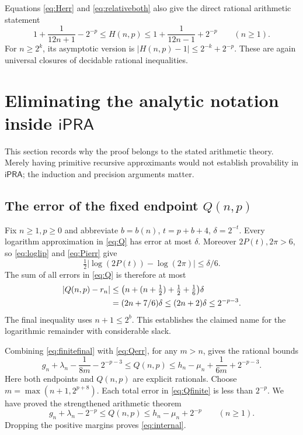 \documentclass[11pt]{article}
\theoremstyle{definition}
\newcommand{\ipra}{\mathsf{iPRA}}
\newcommand{\abs}[1]{\left|#1\right|}
\newcommand{\lmargin}{\lambda}
\newcommand{\umargin}{\mu}
\begin{document}
Equations \eqref{eq:Herr} and \eqref{eq:relativeboth} also give the
direct rational arithmetic statement
\begin{equation}\label{eq:Hinternal}
 1+\frac1{12n+1}-2^{-p}\le H(n,p)
 \le1+\frac1{12n-1}+2^{-p}\qquad(n\ge1).
\end{equation}
For $n\ge2^k$, its asymptotic version is
$\abs{H(n,p)-1}\le2^{-k}+2^{-p}$. These are again universal closures
of decidable rational inequalities.

\section{Eliminating the analytic notation inside \texorpdfstring{$\ipra$}{iPRA}}
\label{sec:elimination}

This section records why the proof belongs to the stated arithmetic
theory. Merely having primitive recursive approximants would not establish
provability in $\ipra$; the induction and precision arguments matter.

\subsection{The error of the fixed endpoint \texorpdfstring{$Q(n,p)$}{Q(n,p)}}

Fix $n\ge1,p\ge0$ and abbreviate $b=b(n)$, $t=p+b+4$,
$\delta=2^{-t}$. Every logarithm approximation in \eqref{eq:Q} has
error at most $\delta$. Moreover $2P(t),2\pi>6$, so
\eqref{eq:loglip} and \eqref{eq:Pierr} give
\[
 \tfrac12\abs{\log(2P(t))-\log(2\pi)}\le\delta/6.
\]
The sum of all errors in \eqref{eq:Q} is therefore at most
\begin{align}
 \abs{Q(n,p)-r_n}
 &\le\bigl(n+(n+\tfrac12)+\tfrac12+\tfrac16\bigr)\delta\notag\\
 &= (2n+7/6)\delta
 \le(2n+2)\delta\le2^{-p-3}.\label{eq:Qerr}
\end{align}
The final inequality uses $n+1\le2^b$. This establishes the claimed
name for the logarithmic remainder with considerable slack.

Combining \eqref{eq:finitefinal} with \eqref{eq:Qerr}, for any
$m>n$, gives the rational bounds
\begin{equation}\label{eq:Qfinite}
 g_n+\lmargin_n-\frac1{8m}-2^{-p-3}
 \le Q(n,p)
 \le h_n-\umargin_n+\frac1{6m}+2^{-p-3}.
\end{equation}
Here both endpoints and $Q(n,p)$ are explicit rationals. Choose
$m=\max(n+1,2^{p+8})$. Each total error in \eqref{eq:Qfinite} is
less than $2^{-p}$. We have proved the strengthened arithmetic theorem
\begin{equation}\label{eq:Qstrong}
 \boxed{\quad
 g_n+\lmargin_n-2^{-p}\le Q(n,p)
 \le h_n-\umargin_n+2^{-p}\qquad(n\ge1).
 \quad}
\end{equation}
Dropping the positive margins proves \eqref{eq:internal}.
\end{document}
